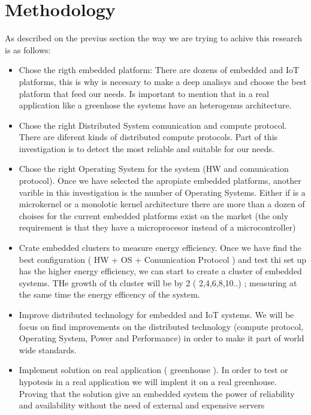 \section{Methodology}
\noindent

As described on the previus section the way we are trying to achive this
research is as follows: 


\begin{itemize}
\item Chose the rigth embedded platform: There are dozens of embedded and IoT
    platforms, this is why is necesary to make a deep analisys and choose the
    best platform that feed our needs. Is important to mention that in a real
    application like a greenhose the systems have an heterogenus architecture.
\item Chose the right Distributed System comunication and compute protocol.
    There are diferent kinds of distributed compute protocols. Part of this
    investigation is to detect the most reliable and suitable for our needs.
\item Chose the right Operating System for the system (HW and comunication
    protocol). Once we have selected the apropiate embedded platforms, another 
    varible in this investigation is the number of Operating
    Systems. Either if is a microkernel or a monolotic kernel architecture
    there are more than a dozen of choises for the current embedded platforms
    exist on the market (the only requirement is that they have a microprocesor
    instead of a microcontroller)
\item Crate embedded clusters to measure energy efficiency. Once we have find
    the best configuration ( HW + OS + Conumication Protocol ) and test thi set
    up has the higher energy efficiency, we can start to create a cluster of
    embedded systems. THe growth of th cluster will be by 2 ( 2,4,6,8,10..) ;
    measuring at the same time the energy efficency of the system.
\item Improve distributed technology for embedded and IoT systems. We will be
    focus on find improvements on the distributed technology (compute
    protocol, Operating System, Power and Performance) in order to make it part
    of world wide standards.
\item Implement solution on real application ( greenhouse ). In order to test
    or hypotesis in a real application we will implent it on a real
    greenhouse. Proving that the solution give an embedded system the power of
    reliability and availability without the need of external and expensive servers 
\end{itemize}


\clearpage
